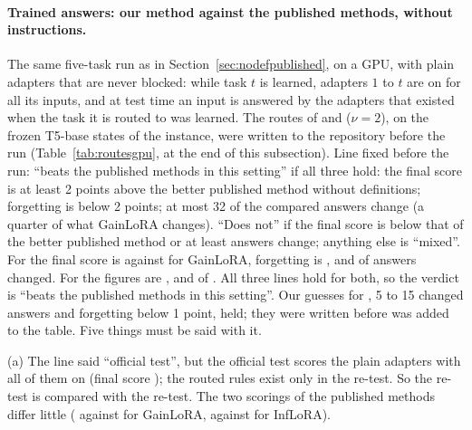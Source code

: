 \paragraph{Trained answers: our method against the published methods, without instructions.} The same five-task run as in Section~\ref{sec:nodefpublished}, on a GPU, with plain adapters that are never blocked: while task $t$ is learned, adapters $1$ to $t$ are on for all its inputs, and at test time an input is answered by the adapters that existed when the task it is routed to was learned.
The routes of \recog{} and \handicap{} ($\nu = 2$), on the frozen T5-base states of the instance, were written to the repository before the run (Table~\ref{tab:routesgpu}, at the end of this subsection).
Line fixed before the run: ``beats the published methods in this setting'' if all three hold: the final score is at least 2 points above the better published method without definitions; forgetting is below 2 points; at most 32 of the \AudOursRidgeCompared{} compared answers change (a quarter of what GainLoRA changes).
``Does not'' if the final score is below that of the better published method or at least \AudPubGainloraNoDefChanged{} answers change; anything else is ``mixed''.
For \recog{} the final score is \AudOursRidgeAP{} against \AudPubGainloraNoDefAP{} for GainLoRA, forgetting is \AudOursRidgeFT{}, and \AudOursRidgeChanged{} of \AudOursRidgeCompared{} answers changed.
For \handicap{} the figures are \AudOursHandicapAP{}, \AudOursHandicapFT{} and \AudOursHandicapChanged{} of \AudOursHandicapCompared{}.
All three lines hold for both, so the verdict is ``beats the published methods in this setting''.
Our guesses for \recog{}, 5 to 15 changed answers and forgetting below 1 point, held; they were written before \handicap{} was added to the table.
Five things must be said with it.

(a) The line said ``official test'', but the official test scores the plain adapters with all of them on (final score \AudOffOursNoDefAP{}); the routed rules exist only in the re-test.
So the re-test is compared with the re-test.
The two scorings of the published methods differ little (\AudPubGainloraNoDefAP{} against \AudOffGainloraNoDefAP{} for GainLoRA, \AudPubInfloraNoDefAP{} against \AudOffInfloraNoDefAP{} for InfLoRA).

